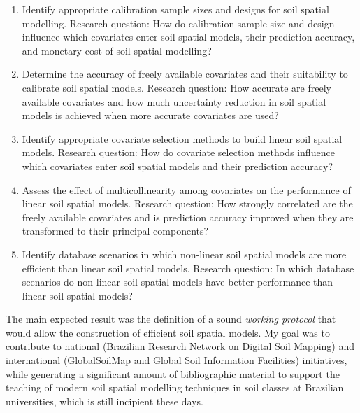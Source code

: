 \begin{enumerate}
\item Identify appropriate calibration sample sizes and designs for soil spatial modelling.\newline
Research question: How do calibration sample size and design influence which covariates enter soil spatial 
models, their prediction accuracy, and monetary cost of soil spatial modelling?

\item Determine the accuracy of freely available covariates and their suitability to calibrate soil spatial
models.\newline
Research question: How accurate are freely available covariates and how much uncertainty reduction in soil 
spatial models is achieved when more accurate covariates are used?

\item Identify appropriate covariate selection methods to build linear soil spatial models.\newline
Research question: How do covariate selection methods influence which covariates enter soil spatial models and 
their prediction accuracy?

\item Assess the effect of multicollinearity among covariates on the performance of linear soil spatial 
models.\newline
Research question: How strongly correlated are the freely available covariates and is prediction accuracy 
improved when they are transformed to their principal components?

\item Identify database scenarios in which non-linear soil spatial models are more efficient than linear soil 
spatial models.\newline
Research question: In which database scenarios do non-linear soil spatial models have better performance than 
linear soil spatial models?
\end{enumerate}

The main expected result was the definition of a sound \emph{working protocol} that would allow the 
construction of efficient soil spatial models. My goal was to contribute to national (Brazilian Research 
Network on Digital Soil Mapping) and international (GlobalSoilMap and Global Soil Information Facilities) 
initiatives, while generating a significant amount of bibliographic material to support the teaching of modern 
soil spatial modelling techniques in soil classes at Brazilian universities, which is still incipient these 
days.

